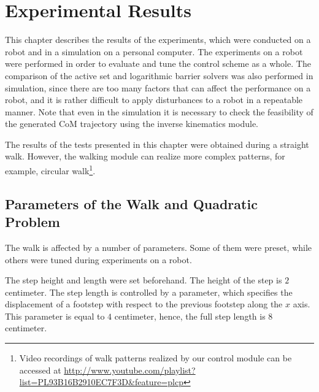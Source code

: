 \chapter{Experimental Results}
\label{ch.results}

This chapter describes the results of the experiments, which were conducted on 
a robot and in a simulation on a personal computer. The experiments on a robot
were performed in order to evaluate and tune the control scheme as a whole.
The comparison of the active set and logarithmic barrier solvers was also
performed in simulation, since there are too many factors that can affect 
the performance on a robot, and it is rather difficult to apply disturbances to 
a robot in a repeatable manner. Note that even in the simulation it is necessary
to check the feasibility of the generated \ac{CoM} trajectory using the inverse
kinematics module. 

The results of the tests presented in this chapter were obtained during a straight 
walk. However, the walking module can realize more complex patterns, for example,
circular walk\footnote{Video recordings of walk patterns realized by our control
module can be accessed at \url{http://www.youtube.com/playlist?list=PL93B16B2910EC7F3D&feature=plcp}}.



\section{Parameters of the Walk and Quadratic Problem}\label{sec.parameters}
The walk is affected by a number of parameters. Some of them were preset, while
others were tuned during experiments on a robot. 

The step height and length were set beforehand. The height of the step is $2$ 
centimeter. The step length is controlled by a parameter, which specifies the 
displacement of a footstep with respect to the previous footstep along the $x$ 
axis. This parameter is equal to $4$ centimeter, hence, the full step length
is $8$ centimeter. 

